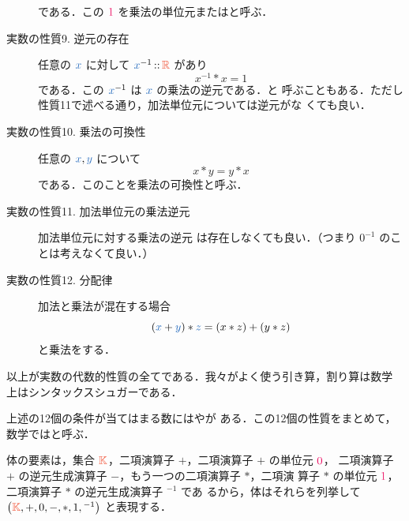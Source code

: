 \documentclass[a5paper,twoside,fleqn,draft]{jsbook}
\begin{document}
\begin{description}
\begin{equation}
\end{equation}
である．この $\hConstant{1}$ を乗法の単位元またはと呼ぶ．
\item[実数の性質9. 逆元の存在] 任意の $\hVar{x}$ に対して $\hVar{x}^{-1}\hIsTypeOf\mRSet$
があり
\begin{equation}
x^{-1}*x=1
\end{equation}
である．この $\hVar{x}^{-1}$ は $\hVar{x}$ の乗法の逆元である．と
呼ぶこともある．ただし性質11で述べる通り，加法単位元については逆元がな
くても良い．
\item[実数の性質10. 乗法の可換性] 任意の $\hVar{x},\hVar{y}$ について
\begin{equation}
x*y=y*x
\end{equation}
である．このことを乗法の可換性と呼ぶ．
\item[実数の性質11. 加法単位元の乗法逆元] 加法単位元に対する乗法の逆元
は存在しなくても良い．（つまり $0^{-1}$ のことは考えなくて良い．）
\item[実数の性質12. 分配律] 加法と乗法が混在する場合
\begin{equation}
(\hVar{x}+\hVar{y})*\hVar{z}=(x*z)+(y*z)
\end{equation}
と乗法をする．
\end{description}
以上が実数の代数的性質の全てである．我々がよく使う引き算，割り算は数学
上はシンタックスシュガーである．

上述の12個の条件が当てはまる数にはやが
ある．この12個の性質をまとめて，数学ではと呼ぶ．

体の要素は，集合 $\mKSet$，二項演算子 $+$，二項演算子 $+$ の単位元 $\hConstant{0}$，
二項演算子 $+$ の逆元生成演算子 $-$，もう一つの二項演算子 $*$，二項演
算子 $*$ の単位元 $\hConstant{1}$，二項演算子 $*$ の逆元生成演算子 ${}^{-1}$ であ
るから，体はそれらを列挙して $\hSingleTuppleWith{\mKSet,+,0,-,*,1,{}^{-1}}$
と表現する．
\end{document}
